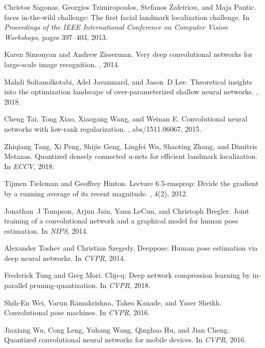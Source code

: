 \documentclass[10pt,twocolumn,letterpaper]{article}
\begin{document}
{\begin{thebibliography}{10}
Christos Sagonas, Georgios Tzimiropoulos, Stefanos Zafeiriou, and Maja Pantic.
 faces in-the-wild challenge: The first facial landmark
  localization challenge.
\newblock In {\em Proceedings of the IEEE International Conference on Computer
  Vision Workshops}, pages 397--403, 2013.

Karen Simonyan and Andrew Zisserman.
\newblock Very deep convolutional networks for large-scale image recognition.
, 2014.

Mahdi Soltanolkotabi, Adel Javanmard, and Jason~D Lee.
\newblock Theoretical insights into the optimization landscape of
  over-parameterized shallow neural networks.
, 2018.

Cheng Tai, Tong Xiao, Xiaogang Wang, and Weinan E.
\newblock Convolutional neural networks with low-rank regularization.
, abs/1511.06067, 2015.

Zhiqiang Tang, Xi Peng, Shijie Geng, Lingfei Wu, Shaoting Zhang, and Dimitris
  Metaxas.
\newblock Quantized densely connected u-nets for efficient landmark
  localization.
\newblock In {\em ECCV}, 2018.

Tijmen Tieleman and Geoffrey Hinton.
\newblock Lecture 6.5-rmsprop: Divide the gradient by a running average of its
  recent magnitude.
, 4(2), 2012.

Jonathan~J Tompson, Arjun Jain, Yann LeCun, and Christoph Bregler.
\newblock Joint training of a convolutional network and a graphical model for
  human pose estimation.
\newblock In {\em NIPS}, 2014.

Alexander Toshev and Christian Szegedy.
\newblock Deeppose: Human pose estimation via deep neural networks.
\newblock In {\em CVPR}, 2014.

Frederick Tung and Greg Mori.
\newblock Clip-q: Deep network compression learning by in-parallel
  pruning-quantization.
\newblock In {\em CVPR}, 2018.

Shih-En Wei, Varun Ramakrishna, Takeo Kanade, and Yaser Sheikh.
\newblock Convolutional pose machines.
\newblock In {\em CVPR}, 2016.

Jiaxiang Wu, Cong Leng, Yuhang Wang, Qinghao Hu, and Jian Cheng.
\newblock Quantized convolutional neural networks for mobile devices.
\newblock In {\em CVPR}, 2016.


\end{thebibliography}}
\end{document}
